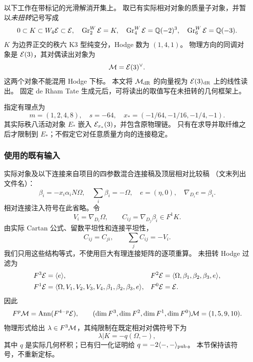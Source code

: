 \documentclass[11pt,a4paper,oneside]{ctexart}
\theoremstyle{cnplain}
\theoremstyle{definition}
\theoremstyle{remark}
\newcommand{\Q}{\mathbb Q}
\newcommand{\Gr}{\operatorname{Gr}}
\newcommand{\dR}{\mathrm{dR}}
\numberwithin{equation}{section}
\begin{document}
以下工作在带标记的光滑解消开集上。
取已有实际相对对象的质量子对象，并暂以\emph{未扭转}记号写成
\begin{equation}\label{deriv:eq:mass}
 0\subset K\subset W_4\cE\subset\cE,
 \quad \Gr^W_2\cE=K,\quad
 \Gr^W_4\cE=\Q(-2)^3,\quad
 \Gr^W_6\cE=\Q(-3).
\end{equation}
$K$ 为边界正交的秩六 K3 型纯变分，Hodge 数为 $(1,4,1)$。
物理方向的同调对象是 $\mathcal E(3)$，其对偶读出对象为
\begin{equation}\label{deriv:eq:M}
 \mathcal M=\mathcal E(3)^\vee.
\end{equation}
这两个对象不能混用 Hodge 下标。
本文将 $\cM_{\dR}$ 的向量视为 $\cE(3)_{\dR}$ 上的线性读出。
固定 de Rham Tate 生成元后，可将读出的取值写在未扭转的几何框架上。

指定有理点为
\begin{equation}\label{deriv:eq:point}
 m=(1,2,4,8),\quad s=-64,\quad
 x_* =(-1/64,-1/16,-1/4,-1).
\end{equation}
其实际秩八活动对象 $E_*$ 嵌入 $\mathcal E_{x_*}(3)$，并包含原物理链。
只有在求导并取纤维之后才限制到 $E_*$；不假定它对任意质量方向的连接稳定。

\subsubsection{使用的既有输入}
实际对象及以下连接来自项目的四参数混合连接稿及顶层相对比较稿
（文末列出文件名）：
\begin{equation}\label{deriv:eq:beta}
 \beta_i=-x_i\alpha_iN\Omega,\quad
 \sum_i\beta_i=-\Omega,\quad e=(\eta,0),\quad
 \nabla_{D_i}e=\beta_i.
\end{equation}
相对连接注入符号在此省略。令
\begin{equation}\label{deriv:eq:C}
 V_i=\nabla_{D_i}\Omega,\qquad
 C_{ij}=\nabla_{D_j}\beta_i\in F^1K.
\end{equation}
由实际 Cartan 公式、留数平坦性和连接平坦性，
\begin{equation}\label{deriv:eq:sum}
 C_{ij}=C_{ji},\qquad \sum_j C_{ij}=-V_i.
\end{equation}
我们只用这些结构等式，不使用巨大有理连接矩阵的逐项重算。
未扭转 Hodge 过滤为
\begin{align}\label{deriv:eq:filterE}
 F^3\mathcal E&=\langle e\rangle,&
 F^2\mathcal E&=\langle\Omega,\beta_1,\beta_2,\beta_3,e\rangle,\nonumber\\
 F^1\mathcal E&=\langle\Omega,V_1,V_2,V_3,V_4,\beta_1,\beta_2,\beta_3,e\rangle,&
 F^0\mathcal E&=\mathcal E.
\end{align}
因此
\begin{equation}\label{deriv:eq:dualHodge}
 F^p\mathcal M=\operatorname{Ann}(F^{4-p}\mathcal E),\qquad
 (\dim F^3,\dim F^2,\dim F^1,\dim F^0)\mathcal M=(1,5,9,10).
\end{equation}
物理形式给出 $\lambda\in F^3\mathcal M$，其纯限制在既定相对对偶符号下为
\begin{equation}\label{deriv:eq:lambda}
 \lambda|K=-q(\Omega,-),
\end{equation}
其中 $q$ 是实际几何杯积；已有归一化证明给 $q=-2\langle-,-\rangle_{\rm pub}$。
本节保持该符号，不重新定标。
\end{document}
